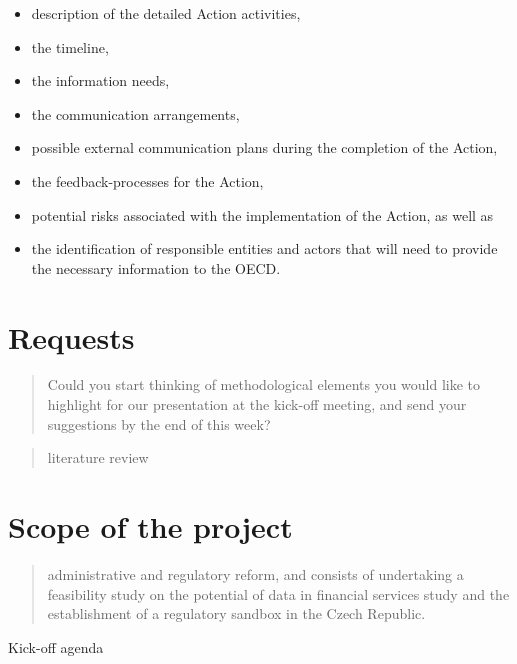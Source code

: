 \documentclass[
]{book}
\begin{document}
\begin{itemize}
\item
  description of the detailed Action activities,
\item
  the timeline,
\item
  the information needs,
\item
  the communication arrangements,
\item
  possible external communication plans during the completion of the Action,
\item
  the feedback-processes for the Action,
\item
  potential risks associated with the implementation of the Action, as well as
\item
  the identification of responsible entities and actors that will need to provide the necessary information to the OECD.
\end{itemize}

\hypertarget{requests}{%
\section{Requests}\label{requests}}

\begin{quote}
Could you start thinking of methodological elements you would like to highlight for our presentation at the kick-off meeting, and send your suggestions by the end of this week?
\end{quote}

\begin{quote}
literature review
\end{quote}

\begin{quote}
\end{quote}

\hypertarget{scope-of-the-project}{%
\section{Scope of the project}\label{scope-of-the-project}}

\begin{quote}
administrative and regulatory reform, and consists of undertaking a feasibility study on the potential of data in financial services study and the establishment of a regulatory sandbox in the Czech Republic.
\end{quote}

Kick-off agenda
\end{document}

